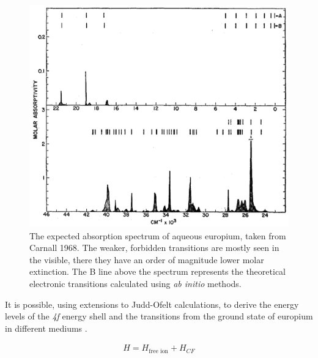 \begin{figure}[tbh]
\begin{center}
\includegraphics[width=\textwidth]{figures/eu_spec.png}
\end{center}
\caption{The expected absorption spectrum of aqueous europium, taken from Carnall 1968\cite{Carnall:1968ch}. The weaker, forbidden transitions are mostly seen in the visible, there they have an order of magnitude lower molar extinction. The B line above the spectrum represents the theoretical electronic transitions calculated using \emph{ab initio} methods.}
\label{fig:eu_spec_theory}
\end{figure}

It is possible, using extensions to Judd-Ofelt calculations, to derive the
energy levels of the \textsl{4f} energy shell and the transitions from the
ground state of europium in different mediums
\cite{Carnall:1968ch,Carnall:1989fc,Richardson:1989vf,vanPieterson:2002hd}.

\begin{align}
  H = H_{\text{free ion}} + H_{CF} \label{eq:lan_ham}
\end{align}


